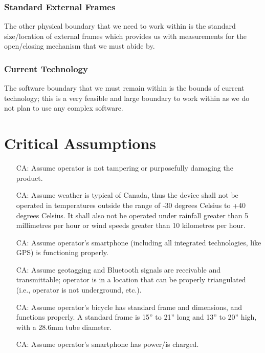 \documentclass{article}
\newcounter{canum} %
\begin{document}
\subsubsection{Standard External Frames}
The other physical boundary that we need to work within is the standard size/location of external frames which provides us with measurements for the open/closing mechanism that we must abide by.
\subsubsection{Current Technology}
The software boundary that we must remain within is the bounds of current technology; this is a very feasible and large boundary to work within as we do not plan to use any complex software.

\section{Critical Assumptions}

\begin{itemize}

\item[CA\refstepcounter{canum}\thecanum\label{CA1}:] Assume operator is not tampering or purposefully damaging the product.
\item[CA\refstepcounter{canum}\thecanum\label{CA2}:] Assume weather is typical of Canada, thus the device shall not be operated in temperatures outside the range of -30 degrees Celsius to +40 degrees Celsius. It shall also not be operated under rainfall greater than 5 millimetres per hour or wind speeds greater than 10 kilometres per hour.
\item[CA\refstepcounter{canum}\thecanum\label{CA3}:] Assume operator's smartphone (including all integrated technologies, like GPS) is functioning properly.
\item[CA\refstepcounter{canum}\thecanum\label{CA4}:] Assume geotagging and Bluetooth signals are receivable and transmittable; operator is in a location that can be properly triangulated (i.e., operator is not underground, etc.). 
\item[CA\refstepcounter{canum}\thecanum\label{CA5}:] Assume operator's bicycle has standard frame and dimensions, and functions properly. A standard frame is 15'' to 21'' long and 13'' to 20'' high, with a 28.6mm tube diameter. 
\item[CA\refstepcounter{canum}\thecanum\label{CA6}:] Assume operator's smartphone has power/is charged. 

\end{itemize}
\end{document}
